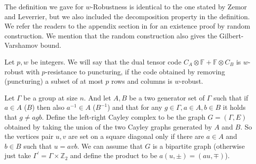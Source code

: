 The definition we gave for $w$-Robustness is identical to the one stated by Zemor and Leverrier, but we also included the decomposition property in the definition. We refer the readers to the appendix section in \cite{leverrier2022quantum} for an existence proof by random construction. We mention that the random construction also gives the Gilbert-Varshamov bound.

\begin{definition} Let $p,w$ be integers. We will say that the dual tensor code $C_{A} \otimes \mathbb{F} + \mathbb{F} \otimes C_{B}$ is $w$-robust with $p$-resistance to puncturing, if the code obtained by removing (puncturing) a subset of at most $p$ rows and columns is $w$-robust.   
\end{definition}

\begin{definition}

%
%
%
  Let $\Gamma$ be a group at size $n$. And let $A,B$ be a two generator set of $\Gamma$ such that if $a \in A$ ($B$) then also $a^{-1}\in A$ ($B^{-1}$) and that for any $g\in \Gamma, a \in A, b \in B$ it holds that $g \neq agb$. Define the left-right Cayley complex to be the graph $G = \left( \Gamma, E \right)$ obtained by taking the union of the two Cayley graphs generated by $A$ and $B$. So the vertices pair $u,v$ are set on a square diagonal only if there are $a\in A$ and $b \in B$ such that $u = avb$. We can assume that $G$ is a bipartite graph (otherwise just take $\Gamma^{\prime} = \Gamma \times \mathbb{Z}_{2}$ and define the product to be $a\left( u,\pm \right) = \left( au, \mp \right)$). 



\end{definition}
